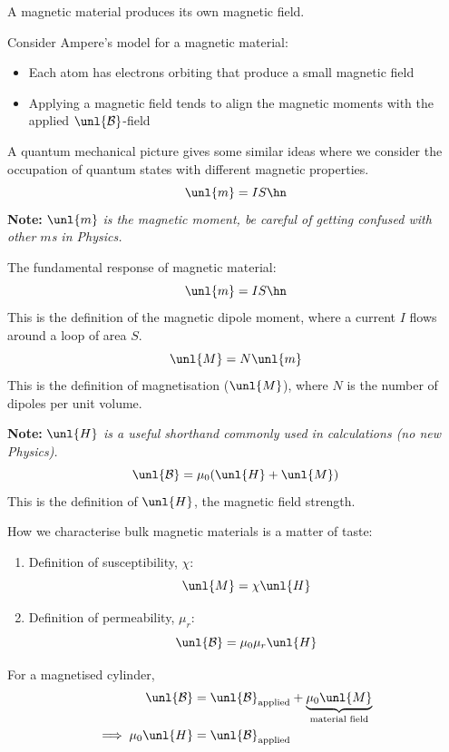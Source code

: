 \documentclass[a4paper, 11pt, normalem]{report}
\renewcommand\B{\mathcal{B}}
\newcommand\uB{\unl{\B}}
\begin{document}
A magnetic material produces its own magnetic field.

Consider Ampere's model for a magnetic material:
\begin{itemize}
    \item Each atom has electrons orbiting that produce a small magnetic field
    \item Applying a magnetic field tends to align the magnetic moments with the applied $\uB$-field
\end{itemize}
A quantum mechanical picture gives some similar ideas where we consider the occupation of quantum states with different magnetic properties.
\begin{equation}
    \unl{m} = IS\hn
\end{equation}
\textbf{Note:} \textit{$\unl{m}$ is the magnetic moment, be careful of getting confused with other $m$s in Physics.}

The fundamental response of magnetic material:
\begin{equation}
    \unl{m} = IS\hn
\end{equation}
This is the definition of the magnetic dipole moment, where a current $I$ flows around a loop of area $S$.
\begin{equation}
    \unl{M} = N\unl{m}
\end{equation}
This is the definition of magnetisation ($\unl{M}$), where $N$ is the number of dipoles per unit volume.

\textbf{Note:} \textit{$\unl{H}$ is a useful shorthand commonly used in calculations (no new Physics).}
\begin{equation}
    \uB = \mu_0(\unl{H} + \unl{M})
\end{equation}
This is the definition of $\unl{H}$, the magnetic field strength.

How we characterise bulk magnetic materials is a matter of taste:
\begin{enumerate}
    \item Definition of susceptibility, $\chi$:
    \begin{equation}
        \unl{M} = \chi \unl{H}
    \end{equation}
    \item Definition of permeability, $\mu_r$:
    \begin{equation}
        \uB = \mu_0\mu_r\unl{H}
    \end{equation}
\end{enumerate}
For a magnetised cylinder,
\begin{align}
    \uB &= \uB_{\text{applied}} + \underbrace{\mu_0\unl{M}}_{\text{material field}} \\
    \implies \mu_0\unl{H} &= \uB_{\text{applied}}
\end{align}
\end{document}
